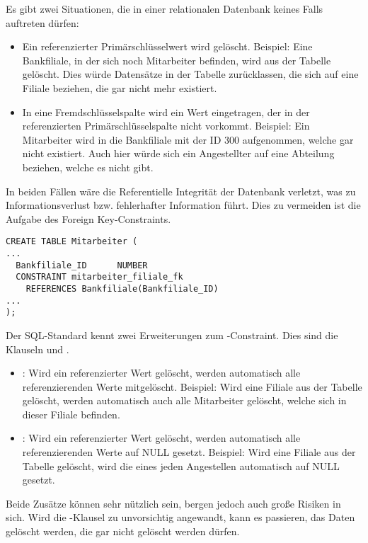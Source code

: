        \begin{merke}
          Es gibt zwei Situationen, die in einer relationalen Datenbank keines Falls auftreten dürfen:
          \begin{itemize}
            \item Ein referenzierter Primärschlüsselwert wird gelöscht. Beispiel: Eine Bankfiliale, in der sich noch Mitarbeiter befinden, wird aus der Tabelle  gelöscht. Dies würde Datensätze in der Tabelle  zurücklassen, die sich auf eine Filiale beziehen, die gar nicht mehr existiert.
            \item In eine Fremdschlüsselspalte wird ein Wert eingetragen, der in der referenzierten Primärschlüsselspalte nicht vorkommt. Beispiel: Ein Mitarbeiter wird in die Bankfiliale mit der ID 300 aufgenommen, welche gar nicht existiert. Auch hier würde sich ein Angestellter auf eine Abteilung beziehen, welche es nicht gibt.
        \end{itemize}
        In beiden Fällen wäre die Referentielle Integrität der Datenbank verletzt, was zu Informationsverlust bzw. fehlerhafter Information führt. Dies zu vermeiden ist die Aufgabe des Foreign Key-Constraints.
        \end{merke}
        \begin{lstlisting}[language=oracle_sql,caption={Ein Foreign Key-Constraint als Inline Constraint anlegen},label=sql09_16]
CREATE TABLE Mitarbeiter (
...
  Bankfiliale_ID      NUMBER
  CONSTRAINT mitarbeiter_filiale_fk
    REFERENCES Bankfiliale(Bankfiliale_ID)
...
);
        \end{lstlisting}
        Der SQL-Standard kennt zwei Erweiterungen zum -Constraint. Dies sind die Klauseln  und .
        \begin{itemize}
          \item {}: Wird ein referenzierter Wert gelöscht, werden automatisch alle referenzierenden Werte mitgelöscht. Beispiel: Wird eine Filiale aus der Tabelle  gelöscht, werden automatisch auch alle Mitarbeiter gelöscht, welche sich in dieser Filiale befinden.
          \item {}: Wird ein referenzierter Wert gelöscht, werden automatisch alle referenzierenden Werte auf NULL gesetzt. Beispiel: Wird eine Filiale aus der Tabelle  gelöscht, wird die  eines jeden Angestellen automatisch auf NULL gesetzt.
        \end{itemize}
        Beide Zusätze können sehr nützlich sein, bergen jedoch auch große Risiken in sich. Wird die -Klausel zu unvorsichtig angewandt, kann es passieren, das Daten gelöscht werden, die gar nicht gelöscht werden dürfen.

